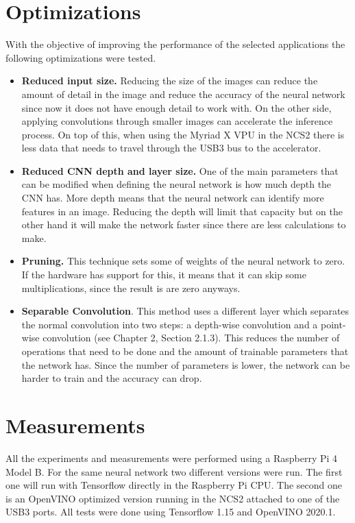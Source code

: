 \section{Optimizations}

With the objective of improving the performance of the selected applications the following optimizations were tested.

\begin{itemize}
    \item \textbf{Reduced input size.} Reducing the size of the images can reduce the amount of detail in the image and reduce the accuracy of the neural network since now it does not have enough detail to work with. On the other side, applying convolutions through smaller images can accelerate the inference process. On top of this, when using the Myriad X VPU in the NCS2 there is less data that needs to travel through the USB3 bus to the accelerator.
    \item \textbf{Reduced CNN depth and layer size.} One of the main parameters that can be modified when defining the neural network is how much depth the CNN has. More depth means that the neural network can identify more features in an image. Reducing the depth will limit that capacity but on the other hand it will make the network faster since there are less calculations to make.
    \item \textbf{Pruning.} This technique sets some of weights of the neural network to zero. If the hardware has support for this, it means that it can skip some multiplications, since the result is are zero anyways.
    \item \textbf{Separable Convolution}. This method uses a different layer which separates the normal convolution into two steps: a depth-wise convolution and a point-wise convolution (see Chapter 2, Section 2.1.3). This reduces the number of operations that need to be done and the amount of trainable parameters that the network has. Since the number of parameters is lower, the network can be harder to train and the accuracy can drop.
\end{itemize}

\section{Measurements}

All the experiments and measurements were performed using a Raspberry Pi 4 Model B. For the same neural network two different versions were run. The first one will run with Tensorflow directly in the Raspberry Pi CPU. The second one is an OpenVINO optimized version running in the NCS2 attached to one of the USB3 ports. All tests were done using Tensorflow 1.15 and OpenVINO 2020.1.

